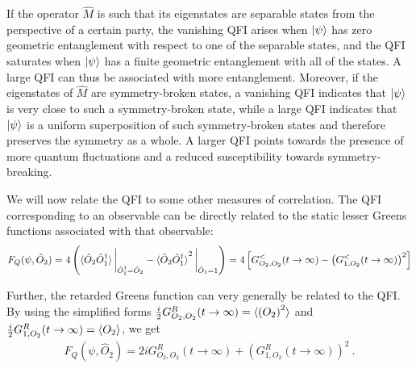 If the operator \(\hat M\) is such that its eigenstates are separable states from the perspective of a certain party, the vanishing QFI arises when \(\ket{\psi}\) has zero geometric entanglement with respect to one of the separable states, and the QFI saturates when \(\ket{\psi}\) has a finite geometric entanglement with all of the states.
A large QFI can thus be associated with more entanglement. 
Moreover, if the eigenstates of \(\hat M\) are symmetry-broken states, a vanishing QFI indicates that \(\ket{\psi}\) is very close to such a symmetry-broken state, while a large QFI indicates that \(\ket{\psi}\) is a uniform superposition of such symmetry-broken states and therefore preserves the symmetry as a whole. A larger QFI points towards the presence of more quantum fluctuations and a reduced susceptibility towards symmetry-breaking.


We will now relate the QFI to some other measures of correlation. The QFI corresponding to an observable can be directly related to the static lesser Greens functions associated with that observable:
\begin{eqnarray}
	\label{lesser-QFI}
	F_Q(\psi,\hat O_2) = 4\left(\braket{\hat O_2 \hat O_1^\dagger}\bigg|_{\hat O_1^\dagger=\hat O_2} - \braket{\hat O_2 \hat O_1^\dagger}^2\bigg|_{\hat O_1=1}\right) = 4\left[G^<_{O_2, O_2}(t\to \infty) - \left(G^<_{1, O_2}(t\to \infty)\right)^2\right]
\end{eqnarray}

Further, the retarded Greens function can very generally be related to the QFI.
By using the simplified forms \(\frac{i}{2}G^R_{O_2,O_2}(t \to \infty) = \braket{\left(O_2\right)^2}\) and \(\frac{i}{2}G^R_{1,O_2}(t \to \infty) = \braket{O_2}\), we get
\begin{eqnarray}
	F_Q(\psi,\hat O_2) = 2iG^R_{O_2, O_2}(t\to \infty) + \left(G^R_{1, O_2}(t\to \infty)\right)^2~.
\end{eqnarray}

